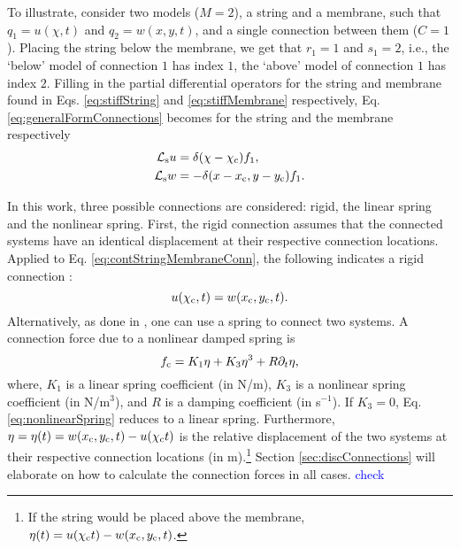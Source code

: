 \documentclass{article}
\def\SWcomment[#1]{\textcolor{blue}{#1}}
\begin{document}
To illustrate, consider two models ($M=2$), a string and a membrane, such that $q_1 = u(\chi ,t)$ and $q_2 = w(x,y,t)$, and a single connection between them ($C = 1$). Placing the string below the membrane, we get that $r_1 = 1$ and $s_1 = 2$, i.e., the `below' model of connection $1$ has index $1$, the `above' model of connection $1$ has index $2$. Filling in the partial differential operators for the string and membrane found in Eqs. \eqref{eq:stiffString} and \eqref{eq:stiffMembrane} respectively, Eq. \eqref{eq:generalFormConnections} becomes for the string and the membrane respectively
\begin{subequations}
\begin{align}\label{eq:contStringMembraneConn}
        \mathcal{L}_{\text{s}} u &= \delta(\chi - \chi_{\text{c}})f_1,\\
        \mathcal{L}_{\text{s}} w &= -\delta(x - x_{\text{c}}, y-y_{\text{c}})f_1.
\end{align}
\end{subequations}

In this work, three possible connections are considered: rigid, the linear spring and the nonlinear spring. First, the rigid connection assumes that the connected systems have an identical displacement at their respective connection locations. Applied to Eq. \eqref{eq:contStringMembraneConn}, the following indicates a rigid connection \cite{theBible}: 
\begin{equation}
    u(\chi_{\text{c}}, t) = w(x_{\text{c}}, y_{\text{c}}, t).
\end{equation} 
Alternatively, as done in \cite{theBible, Bilbao2009Modular}, one can use a spring to connect two systems. A connection force due to a nonlinear damped spring is
\begin{equation}\label{eq:nonlinearSpring}
    f_{\text{c}} = K_1\eta + K_3\eta^3 + R\partial_t \eta,
\end{equation}
where, $K_1$ is a linear spring coefficient (in N/m), $K_3$ is a nonlinear spring coefficient (in N/m$^3$), and $R$ is a damping coefficient (in s$^{-1}$). If $K_3 = 0$, Eq. \eqref{eq:nonlinearSpring} reduces to a linear spring. Furthermore, $\eta = \eta(t) = w(x_{\text{c}}, y_{\text{c}}, t) - u(\chi_{\text{c}} t)$ is the relative displacement of the two systems at their respective connection locations (in m).\footnote{If the string would be placed above the membrane, $\eta(t) = u(\chi_{\text{c}} t) - w(x_{\text{c}}, y_{\text{c}}, t)$.} Section \ref{sec:discConnections} will elaborate on how to calculate the connection forces in all cases. \SWcomment[check]
\end{document}

